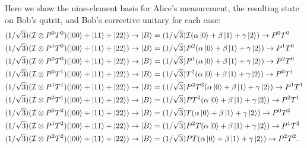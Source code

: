 \documentclass{article}
\theoremstyle{definition}
\newcommand{\al}{\alpha}
\newcommand{\be}{\beta}
\newcommand{\Id}{\mathcal{I}}
\begin{document}
Here we show the nine-element basis for Alice's measurement, the resulting state on Bob's qutrit, and Bob's corrective unitary for each case:
\begin{align*}
	(1/\sqrt{3})(\Id \otimes P^0 T^0)(\ket{00} + \ket{11} + \ket{22}) &\to \ket{B} = (1/\sqrt{3})\Id(\al\ket{0} + \be\ket{1} + \gamma\ket{2}) \to P^0T^0 \\
	(1/\sqrt{3})(\Id \otimes P^1 T^0)(\ket{00} + \ket{11} + \ket{22}) &\to \ket{B} = (1/\sqrt{3}) P^2(\al\ket{0} + \be\ket{1} + \gamma\ket{2}) \to P^1 T^0\\
	(1/\sqrt{3})(\Id \otimes P^2 T^0)(\ket{00} + \ket{11} + \ket{22}) &\to \ket{B} = (1/\sqrt{3})P^1(\al\ket{0} + \be\ket{1} + \gamma\ket{2}) \to P^2 T^0\\
	(1/\sqrt{3})(\Id \otimes P^0 T^1)(\ket{00} + \ket{11} + \ket{22}) &\to \ket{B} = (1/\sqrt{3})T^2(\al\ket{0} + \be\ket{1} + \gamma\ket{2}) \to P^0 T^1\\
	(1/\sqrt{3})(\Id \otimes P^1 T^1)(\ket{00} + \ket{11} + \ket{22}) &\to \ket{B} = (1/\sqrt{3})P^2  T^2(\al\ket{0} + \be\ket{1} + \gamma\ket{2}) \to P^1T^1\\
	(1/\sqrt{3})(\Id \otimes P^2 T^1)(\ket{00} + \ket{11} + \ket{22}) &\to \ket{B} = (1/\sqrt{3}) P T^2(\al\ket{0} + \be\ket{1} + \gamma\ket{2}) \to P^2 T^1\\
	(1/\sqrt{3})(\Id \otimes P^0 T^2)(\ket{00} + \ket{11} + \ket{22}) &\to \ket{B} = (1/\sqrt{3}) T(\al\ket{0} + \be\ket{1} + \gamma\ket{2}) \to P^0 T^2\\
	(1/\sqrt{3})(\Id \otimes P^1 T^2)(\ket{00} + \ket{11} + \ket{22}) &\to \ket{B} = (1/\sqrt{3}) P^2 T (\al\ket{0} + \be\ket{1} + \gamma\ket{2}) \to P^1 T^2\\
	(1/\sqrt{3})(\Id \otimes P^2 T^2)(\ket{00} + \ket{11} + \ket{22}) &\to \ket{B} = (1/\sqrt{3}) P T(\al\ket{0} + \be\ket{1} + \gamma\ket{2}) \to P^2 T^2.
\end{align*}
\end{document}
